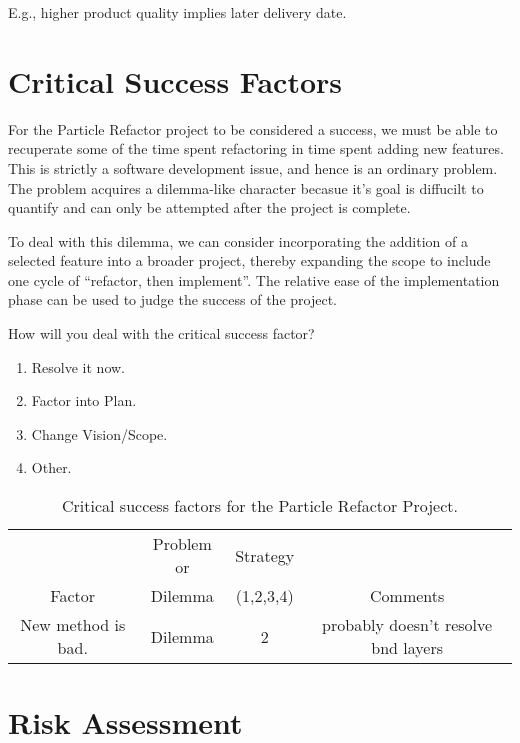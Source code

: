 \documentclass[11pt]{nmemo}
\begin{document}
E.g., higher product quality implies later delivery date.


\newpage
\section*{Critical Success Factors}

For the Particle Refactor project to be considered a success, we must
be able to recuperate some of the time spent refactoring in time spent
adding new features. This is strictly a software development issue,
and hence is an ordinary problem. The problem acquires a dilemma-like
character becasue it's goal is diffucilt to quantify and can only be
attempted after the project is complete.

To deal with this dilemma, we can consider incorporating the addition
of a selected feature into a broader project, thereby expanding the
scope to include one cycle of ``refactor, then implement''. The
relative ease of the implementation phase can be used to judge the
success of the project.

How will you deal with the critical success factor?
\begin{enumerate}
  \item Resolve it now.
  \item Factor into Plan.
  \item Change Vision/Scope.
  \item Other.
\end{enumerate}

\begin{table}[ht]
  \begin{center}
    \caption{Critical success factors for the Particle Refactor Project.}
    \label{tab:critical-success}
    \begin{tabular}{|c|c|c|c|} 
    \hline
                       & Problem or & Strategy  &          \\
    Factor             &  Dilemma   & (1,2,3,4) & Comments \\ 
    \hline\hline
    New method is bad. &  Dilemma   &    2      & probably doesn't
                                                  resolve bnd layers \\
    \hline
    \end{tabular}
  \end{center}
\end{table}


\newpage
\section*{Risk Assessment}
\end{document}
